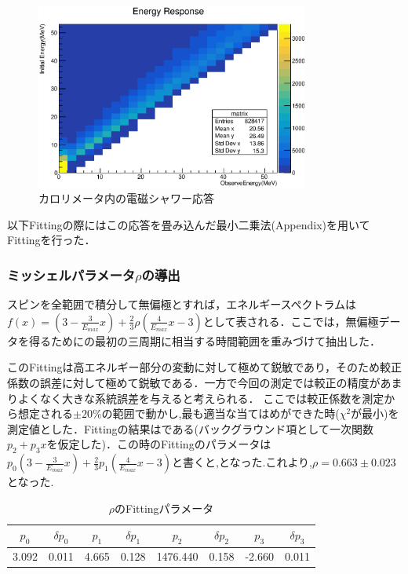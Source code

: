 \begin{figure}[bht]
  \centering
  \includegraphics[width=0.8\textwidth]{figure/hatano/response.eps}
  \caption{カロリメータ内の電磁シャワー応答}
  \label{hatano_fig:response}
\end{figure}

以下Fittingの際にはこの応答を畳み込んだ最小二乗法(Appendix)を用いてFittingを行った．

\subsubsection{ミッシェルパラメータ$\rho$の導出}
スピンを全範囲で積分して無偏極とすれば，エネルギースペクトラムは$f(x)=(3-\frac{3}{E_{max}}x)+\frac{2}{3}\rho(\frac{4}{E_{max}}x-3)$として表される．ここでは，無偏極データを得るためにの最初の三周期に相当する時間範囲を重みづけて抽出した．

このFittingは高エネルギー部分の変動に対して極めて鋭敏であり，そのため較正係数の誤差に対して極めて鋭敏である．一方で今回の測定では較正の精度があまりよくなく大きな系統誤差を与えると考えられる．
ここでは較正係数を測定から想定される$\pm20\%$の範囲で動かし,最も適当な当てはめができた時($\chi^2$が最小)を測定値とした．Fittingの結果はである(バックグラウンド項として一次関数$p_2+p_3x$を仮定した)．この時のFittingのパラメータは$p_0(3-\frac{3}{E_{max}}x)+\frac{2}{3}p_1(\frac{4}{E_{max}}x-3)$と書くと,となった.これより,$\rho=0.663 \pm 0.023$となった.
\begin{table}[bht]
  \centering
  \caption{$\rho$のFittingパラメータ}
  \begin{tabular}{cccccccc}
    $p_0$ & $\delta p_0$ & $p_1$ & $\delta p_1$ & $p_2$ & $\delta p_2$ & $p_3$ & $\delta p_3$ \\ \hline
    3.092 & 0.011 & 4.665 & 0.128 & 1476.440 & 0.158 & -2.660 & 0.011
  \end{tabular}
  \label{hatano_tab:rho}
\end{table}

